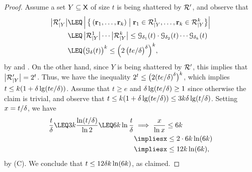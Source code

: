 
\begin{proof}
    Assume a set $Y \subseteq \textsf{X}$ of size $t$ is being
    shattered by $\mathcal{R}'$, and observe that
    \begin{align*}
        \bigl| \VCProj{\RangeSetA}{Y} \bigr|%
        &%
        \LEQ%
        \cardin{\,%
           \Set{\,%
              \pth[]{ \range_1, \ldots, \range_k}
           }{ \range_1 \in \smash{\VCProj{\RangeSet^1}{Y}}, \ldots,
              \range_k \in \smash{\VCProj{\RangeSet^k}{Y}} \bigr.} \Bigr. }%
        \\&
        \LEQ%
        \cardin{\smash{\VCProj{\RangeSet^1}{Y}} \bigr.} \cdots
        \cardin{\smash{\VCProj{\RangeSet^k}{Y}}\bigr.}%
        \leq%
        {\Growth{\Dim_1}{t}}
        \cdot {\Growth{\Dim_2}{t}} \cdots
        {\Growth{\Dim_k}{t}}%
      \\
      &\LEQ%
        \pth{\bigl. \Growth{\Dim}{t}}^k%
        \leq%
        \Bigl( 2\, \bigl(
        {t e}/{\Dim} \bigr)^\Dim \Bigr)^k ,
    \end{align*}
    by  and . On the other hand,
    since $Y$ is being shattered by $\mathcal{R}'$, this implies that
    $\bigl| \mathcal{R}'_{|Y}\bigr| = 2^t$. Thus, we have the
    inequality
    $2^t \leq \bigl( 2 \pth{ \nfrac{t e}{\Dim}}^\Dim \bigr)^k$, which
    implies $t \leq k \pth{ 1 + \Dim \lg(\nfrac{t e}{\Dim }) }$.
    Assume that $t \geq e$ and
    $\Dim \lg\pth{\nfrac{t e}{\Dim }} \geq 1$ since otherwise the
    claim is trivial, and observe that
    $t \leq k \pth{ 1 + \Dim \lg\pth{\nfrac{t e}{\Dim }} } \leq 3 k
    \Dim \lg (t/ \Dim)$.  Setting $x = t/\delta$, we have
    \begin{align*}
        \frac{t}{\Dim}%
        \LEQ%
        3k \frac{\ln\pth{ \nfrac{t}{\Dim}}}{\ln 2} %
        \LEQ%
        6k \ln \frac{t}{\Dim}%
        &\implies%
        \frac{x}{\ln x} \leq 6k%
        \\&
        \implies%
        x \leq 2 \cdot 6k \ln \pth{ 6k }%
        \\&
        \implies%
        x \leq 12 k \ln (6 k ),
    \end{align*}
    by (C).  We conclude that
    $t \leq 12 \delta k \ln (6 k )$, as claimed.
\end{proof}

